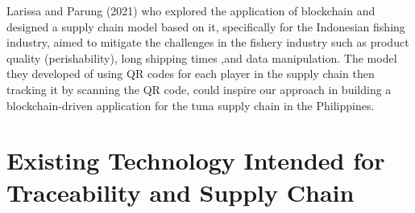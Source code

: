 Larissa and Parung (2021) \nocite{rrl-SCMBTFII1} who explored the application of blockchain and designed a supply chain model based on it, specifically for the Indonesian fishing industry, aimed to mitigate the challenges in the fishery industry such as product quality (perishability), long shipping times ,and data manipulation. The model they developed of using QR codes for each player in the supply chain then tracking it by scanning the QR code, could inspire our approach in building a blockchain-driven application for the tuna supply chain in the Philippines.

\section{Existing Technology Intended for Traceability and Supply Chain}

